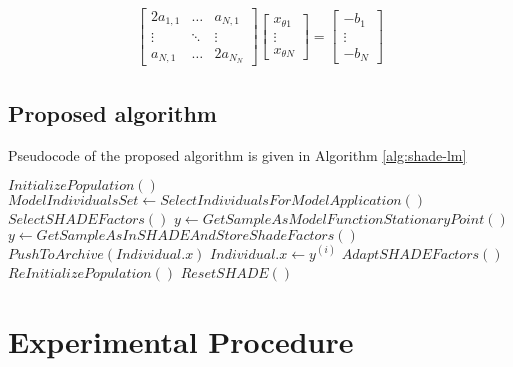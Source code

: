 \documentclass[sigconf]{acmart}
\begin{document}
\begin{align}
			\begin{bmatrix}
				2a_{1,1} & \ldots & a_{N,1} \\           
           \vdots & \ddots & \vdots   \\
           a_{N,1} & \ldots & 2a_{N_N}
          \end{bmatrix} 
		  \begin{bmatrix}
			x_{\theta1} \\           
			\vdots \\
			x_{\theta N}
		   \end{bmatrix}
			=
	  \begin{bmatrix}
           -b_1 \\
           \vdots \\
           -b_N
         \end{bmatrix}
  \end{align}


\subsection{Proposed algorithm}

Pseudocode of the proposed algorithm is given in Algorithm \ref{alg:shade-lm}

\begin{algorithm}[H]
	\begin{algorithmic}[1]
	\footnotesize
	\State $InitializePopulation()$
		\State $ModelIndividualsSet \gets SelectIndividualsForModelApplication()$
		\State $SelectSHADEFactors()$
				\State $y \gets GetSampleAsModelFunctionStationaryPoint()$
			\Else
				\State $y \gets GetSampleAsInSHADEAndStoreShadeFactors()$
			\EndIf
				\State $PushToArchive(Individual.x)$
				\State $Individual.x \gets y^{(i)}$
			\EndIf
		\EndFor
		\State $AdaptSHADEFactors()$
			\State $ReInitializePopulation()$
			\State $ResetSHADE()$
		\EndIf
	\EndWhile
	\caption{SHADE-LM pseudocode%
	\label{alg:shade-lm}}
	\end{algorithmic}
	\end{algorithm}
  

%
\section{Experimental Procedure}
\end{document}
